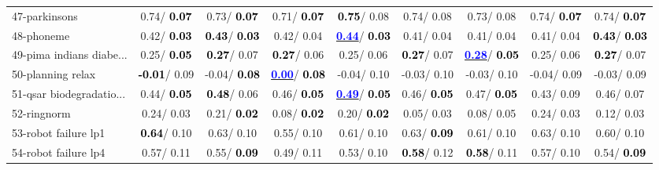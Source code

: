 \begin{table}[h]
\begin{center}
\begin{tabular}{lc|c|c|c|c|c|c|c}
47-parkinsons &   0.74/\textcolor{black}{\textbf{  0.07}} &   0.73/\textcolor{black}{\textbf{  0.07}} &   0.71/\textcolor{black}{\textbf{  0.07}} & \textcolor{black}{\textbf{  0.75}}/  0.08 &   0.74/  0.08 &   0.73/  0.08 &   0.74/\textcolor{black}{\textbf{  0.07}} &   0.74/\textcolor{black}{\textbf{  0.07}} \\
48-phoneme &   0.42/\textcolor{black}{\textbf{  0.03}} & \textcolor{black}{\textbf{  0.43}}/\textcolor{black}{\textbf{  0.03}} &   0.42/  0.04 & \underline{\textcolor{blue}{\textbf{  0.44}}}/\textcolor{black}{\textbf{  0.03}} &   0.41/  0.04 &   0.41/  0.04 &   0.41/  0.04 & \textcolor{black}{\textbf{  0.43}}/\textcolor{black}{\textbf{  0.03}} \\
49-pima indians diabe... &   0.25/\textcolor{black}{\textbf{  0.05}} & \textcolor{black}{\textbf{  0.27}}/  0.07 & \textcolor{black}{\textbf{  0.27}}/  0.06 &   0.25/  0.06 & \textcolor{black}{\textbf{  0.27}}/  0.07 & \underline{\textcolor{blue}{\textbf{  0.28}}}/\textcolor{black}{\textbf{  0.05}} &   0.25/  0.06 & \textcolor{black}{\textbf{  0.27}}/  0.07 \\
50-planning relax & \textcolor{black}{\textbf{ -0.01}}/  0.09 &  -0.04/\textcolor{black}{\textbf{  0.08}} & \underline{\textcolor{blue}{\textbf{  0.00}}}/\textcolor{black}{\textbf{  0.08}} &  -0.04/  0.10 &  -0.03/  0.10 &  -0.03/  0.10 &  -0.04/  0.09 &  -0.03/  0.09 \\
51-qsar biodegradatio... &   0.44/\textcolor{black}{\textbf{  0.05}} & \textcolor{black}{\textbf{  0.48}}/  0.06 &   0.46/\textcolor{black}{\textbf{  0.05}} & \underline{\textcolor{blue}{\textbf{  0.49}}}/\textcolor{black}{\textbf{  0.05}} &   0.46/\textcolor{black}{\textbf{  0.05}} &   0.47/\textcolor{black}{\textbf{  0.05}} &   0.43/  0.09 &   0.46/  0.07 \\
52-ringnorm &   0.24/  0.03 &   0.21/\textcolor{black}{\textbf{  0.02}} &   0.08/\textcolor{black}{\textbf{  0.02}} &   0.20/\textcolor{black}{\textbf{  0.02}} &   0.05/  0.03 &   0.08/  0.05 &   0.24/  0.03 &   0.12/  0.03 \\
53-robot failure lp1 & \textcolor{black}{\textbf{  0.64}}/  0.10 &   0.63/  0.10 &   0.55/  0.10 &   0.61/  0.10 &   0.63/\textcolor{black}{\textbf{  0.09}} &   0.61/  0.10 &   0.63/  0.10 &   0.60/  0.10 \\ \hline
54-robot failure lp4 &   0.57/  0.11 &   0.55/\textcolor{black}{\textbf{  0.09}} &   0.49/  0.11 &   0.53/  0.10 & \textcolor{black}{\textbf{  0.58}}/  0.12 & \textcolor{black}{\textbf{  0.58}}/  0.11 &   0.57/  0.10 &   0.54/\textcolor{black}{\textbf{  0.09}} \\

\end{tabular}
\end{center}
\end{table}
